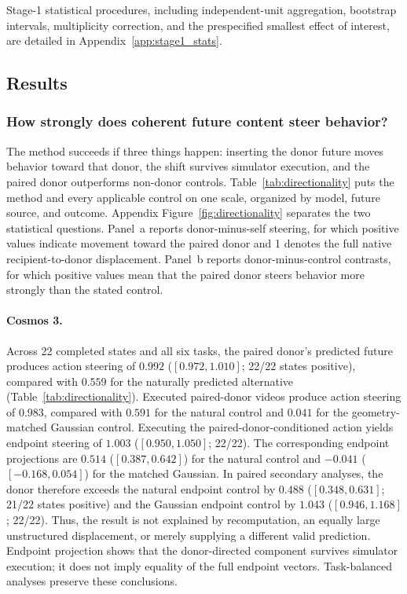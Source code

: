 \documentclass{article}
\begin{document}
Stage-1 statistical procedures, including independent-unit aggregation, bootstrap intervals, multiplicity correction, and the prespecified smallest effect of interest, are detailed in Appendix~\ref{app:stage1_stats}.

\subsection{Results}
\label{sec:results}

\subsubsection{How strongly does coherent future content steer behavior?}
\label{sec:steering}

The method succeeds if three things happen: inserting the donor future moves behavior toward that donor, the shift survives simulator execution, and the paired donor outperforms non-donor controls. Table~\ref{tab:directionality} puts the method and every applicable control on one scale, organized by model, future source, and outcome. Appendix Figure~\ref{fig:directionality} separates the two statistical questions. Panel~a reports donor-minus-self steering, for which positive values indicate movement toward the paired donor and 1 denotes the full native recipient-to-donor displacement. Panel~b reports donor-minus-control contrasts, for which positive values mean that the paired donor steers behavior more strongly than the stated control.

\paragraph{Cosmos 3.}
Across 22 completed states and all six tasks, the paired donor's predicted future produces action steering of $0.992$ ($[0.972,1.010]$; 22/22 states positive), compared with $0.559$ for the naturally predicted alternative (Table~\ref{tab:directionality}). Executed paired-donor videos produce action steering of $0.983$, compared with $0.591$ for the natural control and $0.041$ for the geometry-matched Gaussian control. Executing the paired-donor-conditioned action yields endpoint steering of $1.003$ ($[0.950,1.050]$; 22/22). The corresponding endpoint projections are $0.514$ ($[0.387,0.642]$) for the natural control and $-0.041$ ($[-0.168,0.054]$) for the matched Gaussian. In paired secondary analyses, the donor therefore exceeds the natural endpoint control by $0.488$ ($[0.348,0.631]$; 21/22 states positive) and the Gaussian endpoint control by $1.043$ ($[0.946,1.168]$; 22/22). Thus, the result is not explained by recomputation, an equally large unstructured displacement, or merely supplying a different valid prediction. Endpoint projection shows that the donor-directed component survives simulator execution; it does not imply equality of the full endpoint vectors. Task-balanced analyses preserve these conclusions.
\end{document}
